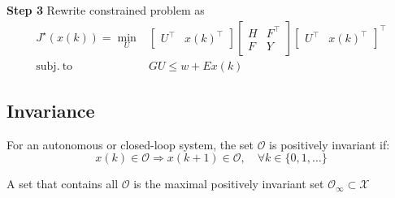 \textbf{Step 3} Rewrite constrained problem as
\[\begin{aligned}
		J^\star(x(k)) = \min_U
		                       & \begin{bmatrix}
			                         U^\top & x(k)^\top
		                         \end{bmatrix}
		\left[\begin{smallmatrix}
				      H & F^\top \\
				      F & Y
			      \end{smallmatrix}\right]
		\begin{bmatrix}
			U^\top & x(k)^\top
		\end{bmatrix}^\top                          \\
		\mathrm{subj. \ to \ } & GU \leq w + Ex(k)
	\end{aligned} \]


%
\subsection{Invariance}

\begin{definition}
	For an autonomous or closed-loop system,
	the set $\mathcal{O}$ is positively invariant if:
	\[
		x(k)\in\mathcal{O}\Rightarrow
		x(k+1) \in \mathcal{O},
		\quad \forall k \in \{0,1,\dots\}
	\]
\end{definition}

\begin{definition}
	A set that contains all $\mathcal{O}$
	is the maximal positively invariant set
	$\mathcal{O}_\infty \subset \mathcal{X}$
\end{definition}

